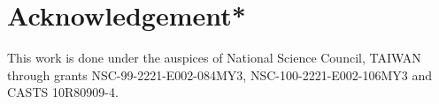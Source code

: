 \documentclass{rsproca}%
\begin{document}
\section{Acknowledgement*}
\label{Acknowledgements}

This work is done under the auspices of National Science Council, TAIWAN through grants NSC-99-2221-E002-084MY3, NSC-100-2221-E002-106MY3 and CASTS 10R80909-4.





\end{document}
